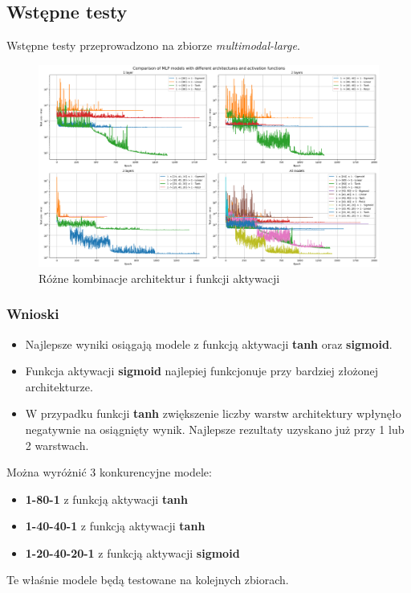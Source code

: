 \documentclass{article}
\begin{document}
\subsection*{Wstępne testy}
Wstępne testy przeprowadzono na zbiorze \textit{multimodal-large}. 
\begin{figure}[H]
    \centering
    \includegraphics[width=\textwidth]{img/nn5/kombinacje.png}
    \caption{Różne kombinacje architektur i funkcji aktywacji}
\end{figure}
\subsubsection*{Wnioski}
\begin{itemize}
    \item Najlepsze wyniki osiągają modele z funkcją aktywacji \textbf{tanh} oraz \textbf{sigmoid}.
    \item Funkcja aktywacji \textbf{sigmoid} najlepiej funkcjonuje przy bardziej złożonej architekturze.
    \item W przypadku funkcji \textbf{tanh} zwiększenie liczby warstw architektury wpłynęło negatywnie na osiągnięty wynik. Najlepsze rezultaty uzyskano już przy 1 lub 2 warstwach.
\end{itemize}

Można wyróżnić 3 konkurencyjne modele:
\begin{itemize}
    \item \textbf{1-80-1} z funkcją aktywacji \textbf{tanh}
    \item \textbf{1-40-40-1} z funkcją aktywacji \textbf{tanh}
    \item \textbf{1-20-40-20-1} z funkcją aktywacji \textbf{sigmoid}
\end{itemize}
Te właśnie modele będą testowane na kolejnych zbiorach.
\end{document}
